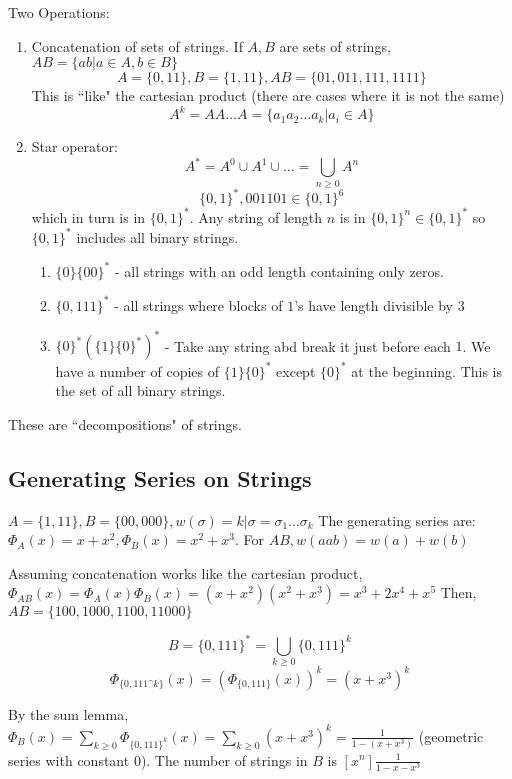 \documentclass{article}
\begin{document}
Two Operations:
\begin{enumerate}
	\item Concatenation of sets of strings. If $A,B$ are sets of strings, $AB = \{ab | a \in A, b \in B \}$
		\example
		$$A = \{0,11\}, B=\{1,11\}, AB = \{01,011,111,1111 \}$$
		This is ``like" the cartesian product (there are cases where it is not the same)
		$$A^k = AA \dots A = \{a_1a_2 \dots a_k | a_i \in A \}$$ %

	\item Star operator: $$A^* = A^0 \cup A^1 \cup \dots = \bigcup_{n \ge 0}A^n$$
		\example
		$$\{0,1\}^*, 001101 \in \{0,1\}^6$$
		which in turn is in $\{0,1\}^*$. Any string of length $n$ is in $\{0,1\}^n \in \{0,1\}^*$ so $\{0,1\}^*$ includes all binary strings.

		\example
		\begin{enumerate}
			\item $\{0\}\{00\}^*$ - all strings with an odd length containing only zeros.
			\item $\{0,111\}^*$ - all strings where blocks of $1$'s have length divisible by $3$
			\item $\{0\}^*(\{1\}\{0\}^*)^*$ - Take any string abd break it just before each $1$. We have a number of copies of $\{1\}\{0\}^*$ except $\{0\}^*$ at the beginning. This is the set of all binary strings.
		\end{enumerate}
		
\end{enumerate}
These are ``decompositions" of strings.

\subsection{Generating Series on Strings}
\example 
$A =\{ 1,11\} , B=\{ 00,000\} , w(\sigma ) = k | \sigma = \sigma_{1} \dots \sigma_{k}$ The generating series are: $\Phi_A(x) = x+x^2, \Phi_B(x) = x^2+x^3$. For $AB, w(aab) = w(a) + w(b)$

Assuming concatenation works like the cartesian product, $\Phi_{AB}(x) = \Phi_A(x) \Phi_B(x) = (x+x^2)(x^2+x^3) = x^3 + 2x^4+x^5$ Then, $AB = \{100,1000,1100,11000\}$

\example
$$B = \{0,111\}^* = \bigcup_{k \ge 0}\{0,111\}^k$$
$$\Phi_{\{ 0,111\^k\} }(x) = \left( \Phi_{\{0,111\}}(x) \right)^k = (x+x^3)^k$$ 

By the sum lemma, $\Phi_B(x) = \sum_{k \ge 0}\Phi_{\{0,111\}^k}(x) = \sum_{k \ge 0}(x+x^3)^k = \frac{1}{1-(x+x^3)}$ (geometric series with constant $0$). The number of strings in $B$ is $[x^n]\frac{1}{1-x-x^3}$
\end{document}
